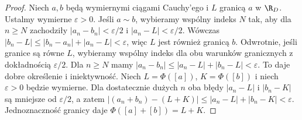 \begin{proof}
Niech $a,b$ będą wymiernymi ciągami Cauchy'ego i $L$ granicą $a$ w $\R_D$. Ustalmy wymierne $\varepsilon>0$. Jeśli $a\sim b$, wybieramy wspólny indeks $N$ tak, aby dla $n\ge N$ zachodziły $|a_n-b_n|<\varepsilon/2$ i $|a_n-L|<\varepsilon/2$. Wówczas $|b_n-L|\le|b_n-a_n|+|a_n-L|<\varepsilon$, więc $L$ jest również granicą $b$. Odwrotnie, jeśli granice są równe $L$, wybieramy wspólny indeks dla obu warunków granicznych z dokładnością $\varepsilon/2$. Dla $n\ge N$ mamy $|a_n-b_n|\le|a_n-L|+|b_n-L|<\varepsilon$. To daje dobre określenie i iniektywność.
Niech $L=\Phi([a])$, $K=\Phi([b])$ i niech $\varepsilon>0$ będzie wymierne. Dla dostatecznie dużych $n$ oba błędy $|a_n-L|$ i $|b_n-K|$ są mniejsze od $\varepsilon/2$, a zatem
$|(a_n+b_n)-(L+K)|\le|a_n-L|+|b_n-K|<\varepsilon$.
Jednoznaczność granicy daje $\Phi([a]+[b])=L+K$.


\end{proof}
